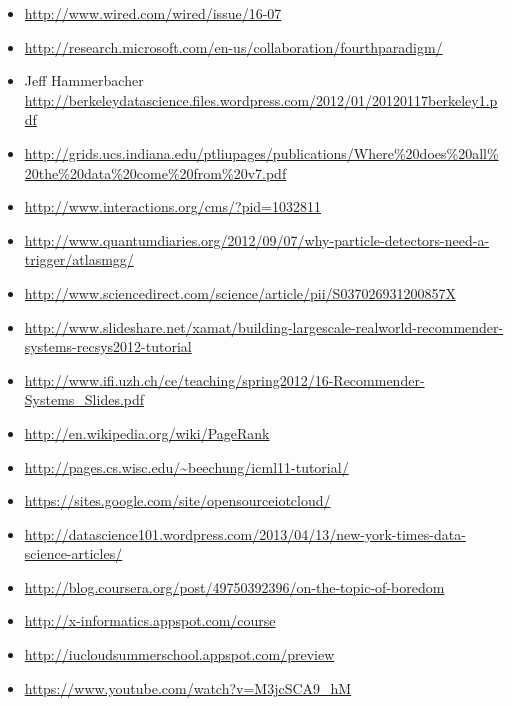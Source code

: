 \begin{itemize}
\item
  \url{http://www.wired.com/wired/issue/16-07}
\item
  \url{http://research.microsoft.com/en-us/collaboration/fourthparadigm/}
\item
  Jeff Hammerbacher
  \url{http://berkeleydatascience.files.wordpress.com/2012/01/20120117berkeley1.pdf}
\item
  \url{http://grids.ucs.indiana.edu/ptliupages/publications/Where\%20does\%20all\%20the\%20data\%20come\%20from\%20v7.pdf}
\item
  \url{http://www.interactions.org/cms/?pid=1032811}
\item
  \url{http://www.quantumdiaries.org/2012/09/07/why-particle-detectors-need-a-trigger/atlasmgg/}
\item
  \url{http://www.sciencedirect.com/science/article/pii/S037026931200857X}
\item
  \url{http://www.slideshare.net/xamat/building-largescale-realworld-recommender-systems-recsys2012-tutorial}
\item
  \url{http://www.ifi.uzh.ch/ce/teaching/spring2012/16-Recommender-Systems_Slides.pdf}
\item
  \url{http://en.wikipedia.org/wiki/PageRank}
\item
  \url{http://pages.cs.wisc.edu/~beechung/icml11-tutorial/}
\item
  \url{https://sites.google.com/site/opensourceiotcloud/}
\item
  \url{http://datascience101.wordpress.com/2013/04/13/new-york-times-data-science-articles/}
\item
  \url{http://blog.coursera.org/post/49750392396/on-the-topic-of-boredom}
\item
  \url{http://x-informatics.appspot.com/course}
\item
  \url{http://iucloudsummerschool.appspot.com/preview}
\item
  \url{https://www.youtube.com/watch?v=M3jcSCA9_hM}
\end{itemize}


